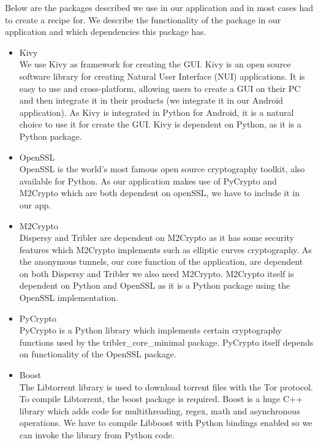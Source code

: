 		Below are the packages described we use in our application and in most cases had to create a recipe for. We describe the functionality of the package in our application and which dependencies this package has.
	
		\begin{itemize}
		
			\item Kivy\\
			We use Kivy as framework for creating the GUI. Kivy is an open source software library for creating Natural User Interface (NUI) applications. It is easy to use and cross-platform, allowing users to create a GUI on their PC and then integrate it in their products (we integrate it in our Android application). As Kivy is integrated in Python for Android, it is a natural choice to use it for create the GUI. Kivy is dependent on Python, as it is a Python package. 
		
			\item OpenSSL\\
			OpenSSL is the world's most famous open source cryptography toolkit, also available for Python. As our application makes use of PyCrypto and M2Crypto which are both dependent on openSSL, we have to include it in our app.
		
			\item M2Crypto\\
			Dispersy and Tribler are dependent on M2Crypto as it has some security features which M2Crypto implements such as elliptic curves cryptography. As the anonymous tunnels, our core function of the application, are dependent on both Dispersy and Tribler we also need M2Crypto. M2Crypto itself is dependent on Python and OpenSSL as it is a Python package using the OpenSSL implementation.
		
			\item PyCrypto\\
			PyCrypto is a Python library which implements certain cryptography functions used by the tribler\_core\_minimal package. PyCrypto itself depends on functionality of the OpenSSL package.
		
			\item Boost\\
			The Libtorrent library is used to download torrent files with the Tor protocol. To compile Libtorrent, the boost package is required. Boost is a huge C++ library which adds code for multithreading, regex, math and asynchronous operations. We have to compile Libboost with Python bindings enabled so we can invoke the library from Python code.
		

\end{itemize}
